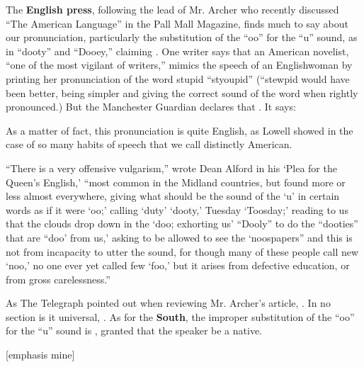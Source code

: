 \begin{ipquote}
\begin{center}
\end{center}
The \textbf{English press}, following the lead of Mr. Archer who recently discussed “The American Language” in the Pall Mall Magazine, finds much to say about our pronunciation, particularly the substitution of the “oo” for the “u” sound, as in “dooty” and “Doo{\kern0pt}ey,” claiming . One writer says that an American novelist, “one of the most vigilant of writers,” mimics the speech of an Englishwoman by printing her pronunciation of the word stupid “styoupid” (“stewpid would have been better, being simpler and giving the correct sound of the word when rightly pronounced.) But the Manchester Guardian declares that . It says:

As a matter of fact, this pronunciation is quite English, as Lowell showed in the case of so many habits of speech that we call distinctly American.

“There is a very offensive vulgarism,” wrote Dean Alford in his ‘Plea for the Queen’s English,’ “most common in the Midland countries, but found more or less almost everywhere, giving what should be the sound of the ‘u’ in certain words as if it were ‘oo;’ calling ‘duty’ ‘dooty,’ Tuesday ‘Toosday;’ reading to us that the clouds drop down in the ‘doo; exhorting us’ “Dooly” to do the “dooties” that are “doo’ from us,’ asking to be allowed to see the ‘noospapers” and this is not from incapacity to utter the sound, for though many of these people call new ‘noo,’ no one ever yet called few ‘foo,’ but it arises from defective education, or from gross carelessness.”

{As The Telegraph pointed out when reviewing Mr. Archer’s article, . In no section is it universal, . As for the \textbf{South}, the improper substitution of the “oo” for the “u” sound is , granted that the speaker be a native.

\raggedleft
{[emphasis mine]}\\
}
\end{ipquote}

